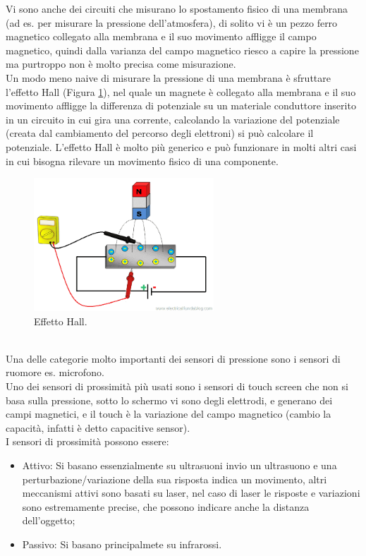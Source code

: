 \documentclass[11pt, twocolumn]{article}
\newenvironment{myitemize}
{ \begin{itemize}[topsep=0ex]
		\setlength{\itemsep}{0pt}
		\setlength{\parskip}{0pt}
		\setlength{\parsep}{0pt}     }
	{ \end{itemize}                  }
\begin{document}
Vi sono anche dei circuiti che misurano lo spostamento fisico di una membrana (ad es. per misurare la pressione dell'atmosfera), di solito vi è un pezzo ferro magnetico collegato alla membrana e il suo movimento affligge il campo magnetico, quindi dalla varianza del campo magnetico riesco a capire la pressione ma purtroppo non è molto precisa come misurazione.\\
Un modo meno naive di misurare la pressione di una membrana è sfruttare l'effetto Hall (Figura \ref{fig:hall}), nel quale un magnete è collegato alla membrana e il suo movimento affligge la differenza di potenziale su un materiale conduttore inserito in un circuito in cui gira una corrente, calcolando la variazione del potenziale (creata dal cambiamento del percorso degli elettroni) si può calcolare il potenziale.
L'effetto Hall è molto più generico e può funzionare in molti altri casi in cui bisogna rilevare un movimento fisico di una componente.
\begin{figure}[!h]
  \centering
  \includegraphics[width=\linewidth,height=5cm]{imgs/hall.png}
  \caption{Effetto Hall.}
  \label{fig:hall}
\end{figure}\\
Una delle categorie molto importanti dei sensori di pressione sono i sensori di ruomore es. microfono.\\
Uno dei sensori di prossimità più usati sono i sensori di touch screen che non si basa sulla pressione, sotto lo schermo vi sono degli elettrodi, e generano dei campi magnetici, e il touch è la variazione del campo magnetico (cambio la capacità, infatti è detto capacitive sensor).\\
I sensori di prossimità possono essere:
\begin{myitemize}
  \item Attivo: Si basano essenzialmente su ultrasuoni invio un ultrasuono e una perturbazione/variazione della sua risposta indica un movimento, altri meccanismi attivi sono basati su laser, nel caso di laser le risposte e variazioni sono estremamente precise, che possono indicare anche la distanza dell'oggetto;
  \item Passivo: Si basano principalmete su infrarossi.
\end{myitemize}
\end{document}
